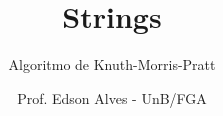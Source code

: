 \title{Strings}
\subtitle{Algoritmo de Knuth-Morris-Pratt}
\author{Prof. Edson Alves - UnB/FGA}
\date{}
